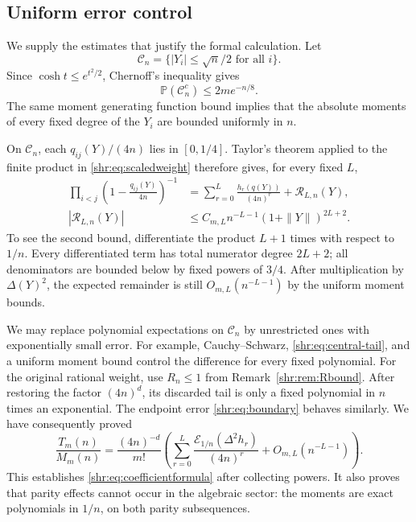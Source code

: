 \documentclass[11pt,letterpaper]{article}
\numberwithin{equation}{section}
\theoremstyle{definition}
\newcommand{\Pp}{\mathbb P}
\newcommand{\1}{\mathbf 1}
\begin{document}
\subsection{Uniform error control}
We supply the estimates that justify the formal calculation.
Let
\[
 \mathcal C_n=\{|Y_i|\le\sqrt n/2\text{ for all }i\}.
\]
Since $\cosh t\le e^{t^2/2}$, Chernoff's inequality gives
\begin{equation}
 \Pp(\mathcal C_n^c)\le2m e^{-n/8}.
 \label{shr:eq:central-tail}
\end{equation}
The same moment generating function bound implies that the absolute moments
of every fixed degree of the $Y_i$ are bounded uniformly in $n$.

On $\mathcal C_n$, each $q_{ij}(Y)/(4n)$ lies in $[0,1/4]$. Taylor's theorem
applied to the finite product in \eqref{shr:eq:scaledweight} therefore gives,
for every fixed $L$,
\begin{align}
 \prod_{i<j}\left(1-\frac{q_{ij}(Y)}{4n}\right)^{-1}
 &=\sum_{r=0}^{L}\frac{h_r(q(Y))}{(4n)^r}+\mathcal R_{L,n}(Y),\\
 |\mathcal R_{L,n}(Y)|
 &\le C_{m,L}n^{-L-1}(1+\|Y\|)^{2L+2}.
 \label{shr:eq:taylorbound}
\end{align}
To see the second bound, differentiate the product $L+1$ times with respect
to $1/n$. Every differentiated term has total numerator degree $2L+2$;
all denominators are bounded below by fixed powers of $3/4$.
After multiplication by $\Delta(Y)^2$, the expected remainder is still
$O_{m,L}(n^{-L-1})$ by the uniform moment bounds.

We may replace polynomial expectations on $\mathcal C_n$ by unrestricted
ones with exponentially small error. For example, Cauchy--Schwarz,
\eqref{shr:eq:central-tail}, and a uniform moment bound control the difference
for every fixed polynomial. For the original rational weight, use
$R_n\le1$ from Remark~\ref{shr:rem:Rbound}. After restoring the factor
$(4n)^d$, its discarded tail is only a fixed polynomial in $n$ times an
exponential. The endpoint error \eqref{shr:eq:boundary} behaves similarly.
We have consequently proved
\begin{equation}
 \frac{T_m(n)}{M_m(n)}=
 \frac{(4n)^{-d}}{m!}
 \left(\sum_{r=0}^{L}\frac{
 \mathcal E_{1/n}(\Delta^2h_r)}{(4n)^r}
 +O_{m,L}(n^{-L-1})\right).
 \label{shr:eq:beforecollect}
\end{equation}
This establishes \eqref{shr:eq:coefficientformula} after collecting powers.
It also proves that parity effects cannot occur in the algebraic sector:
the moments are exact polynomials in $1/n$, on both parity subsequences.
\end{document}
